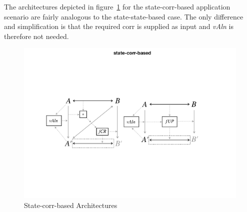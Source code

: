 The architectures depicted in figure~\ref{fig:stateCorrBased} for the state-corr-based application scenario are fairly analogous to the state-state-based case.
The only difference and simplification is that the required corr is supplied as input and \emph{vAln} is therefore not needed.
\begin{figure}[tb!]
	\centering
	\includegraphics[width=\columnwidth]{diagrams/foundations//state-corr-based}
	\caption{State-corr-based Architectures}
	\label{fig:stateCorrBased}
\end{figure}

